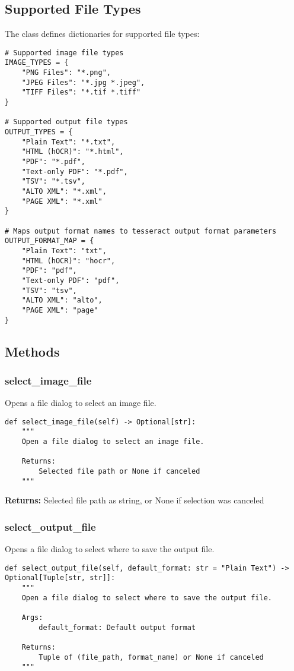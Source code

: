 \subsection{Supported File Types}

The class defines dictionaries for supported file types:

\begin{verbatim}
# Supported image file types
IMAGE_TYPES = {
    "PNG Files": "*.png",
    "JPEG Files": "*.jpg *.jpeg",
    "TIFF Files": "*.tif *.tiff"
}

# Supported output file types
OUTPUT_TYPES = {
    "Plain Text": "*.txt",
    "HTML (hOCR)": "*.html",
    "PDF": "*.pdf",
    "Text-only PDF": "*.pdf",
    "TSV": "*.tsv",
    "ALTO XML": "*.xml",
    "PAGE XML": "*.xml"
}

# Maps output format names to tesseract output format parameters
OUTPUT_FORMAT_MAP = {
    "Plain Text": "txt",
    "HTML (hOCR)": "hocr",
    "PDF": "pdf",
    "Text-only PDF": "pdf",
    "TSV": "tsv",
    "ALTO XML": "alto",
    "PAGE XML": "page"
}
\end{verbatim}

\subsection{Methods}

\subsubsection{select\_image\_file}

Opens a file dialog to select an image file.

\begin{verbatim}
def select_image_file(self) -> Optional[str]:
    """
    Open a file dialog to select an image file.
    
    Returns:
        Selected file path or None if canceled
    """
\end{verbatim}

\textbf{Returns:} Selected file path as string, or None if selection was canceled

\subsubsection{select\_output\_file}

Opens a file dialog to select where to save the output file.

\begin{verbatim}
def select_output_file(self, default_format: str = "Plain Text") -> Optional[Tuple[str, str]]:
    """
    Open a file dialog to select where to save the output file.
    
    Args:
        default_format: Default output format
        
    Returns:
        Tuple of (file_path, format_name) or None if canceled
    """
\end{verbatim}

